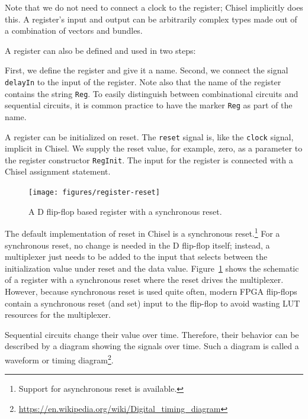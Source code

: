 \documentclass[%
    10pt,
    headinclude, footexclude,
    openright, %
    notitlepage,
    cleardoubleempty,
    headsepline,
    pointlessnumbers,
    bibtotoc, idxtotoc,
    ]{scrbook}
\newcommand{\code}[1]{{\lstinline[basicstyle=\small\ttfamily]{#1}}}
\newcommand{\myref}[2]{\href{#1}{#2}}
\renewcommand{\myref}[2]{{#2}{\footnote{\url{#1}}}}
\begin{document}

\noindent Note that we do not need to connect a clock to the register; Chisel implicitly does this.
A register's input and output can be arbitrarily complex types
made out of a combination of vectors and bundles.

A register can also be defined and used in two steps:


First, we define the register and give it a name. Second, we connect the signal
\code{delayIn} to the input of the register. Note also that the name of the register
contains the string \code{Reg}. To easily distinguish between combinational
circuits and sequential circuits, it is common practice to have the marker
\code{Reg} as part of the name.

A register can be initialized on reset. The \code{reset} signal is, like the \code{clock} signal,
implicit in Chisel. We supply the reset value, for example, zero, as a parameter to the register
constructor \code{RegInit}. The input for the register is connected with a Chisel
assignment statement.


\begin{figure}
  \centering
  \texttt{[image: figures/register-reset]}
  \caption{A D flip-flop based register with a synchronous reset.}
  \label{fig:register-reset}
\end{figure}


The default implementation of reset in Chisel is a synchronous
reset.\footnote{Support for asynchronous reset is available.}
For a synchronous reset, no change is needed in the D flip-flop itself; instead, a multiplexer just
needs to be added to the input that
selects between the initialization value under reset and the data value.
Figure~\ref{fig:register-reset} shows the schematic of a register with a synchronous reset
where the reset drives the multiplexer. However, because synchronous reset is used quite often,
modern FPGA flip-flops contain a synchronous reset (and set) input to the flip-flop to avoid wasting
LUT resources for the multiplexer.

Sequential circuits change their value over time. Therefore, their behavior can be described
by a diagram showing the signals over time. Such a diagram is called a waveform or
\myref{https://en.wikipedia.org/wiki/Digital_timing_diagram}{timing diagram}.
\end{document}
